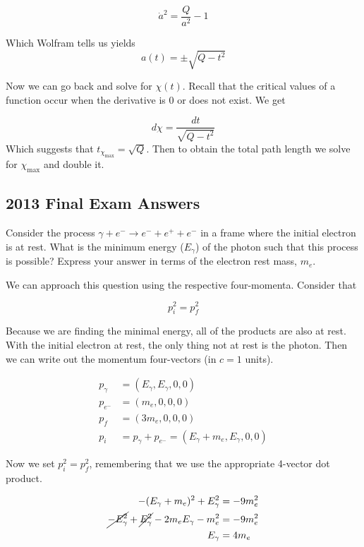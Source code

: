 \documentclass[11pt,largemargins]{homework}
\begin{document}
$$
\dot{a}^2 = \frac{Q}{a^2} - 1
$$

Which Wolfram tells us yields
$$
a(t) = \pm \sqrt{Q - t^2}
$$

Now we can go back and solve for $\chi(t)$.  Recall that the critical values of a function occur when the derivative is 0 or does not exist.  We get 

$$
d\chi = \frac{dt}{\sqrt{Q - t^2}}
$$
Which suggests that $t_{\chi_{\mathrm{max}}} = \sqrt{Q}$.  Then to obtain the total path length we solve for $\chi_{\mathrm{max}}$ and double it.

\setcounter{questionCounter}{0}

\subsection*{2013 Final Exam Answers}

\question
Consider the process $\gamma + e^- \to e^- + e^+ + e^-$ in a frame where the initial electron is at rest.  What is the minimum energy ($E_\gamma$) of the photon such that this process is possible?  Express your answer in terms of the electron rest mass, $m_e$.

We can approach this question using the respective four-momenta.  Consider that

$$p_{i}^2 = p_{f}^2 $$

Because we are finding the minimal energy, all of the products are also at rest.  With the initial electron at rest, the only thing not at rest is the photon.  Then we can write out the momentum four-vectors (in $c=1$ units).

\begin{subequations}
\begin{align*}
p_\gamma &= (E_\gamma, E_\gamma, 0, 0) \\
p_{e^-} &= (m_e, 0, 0, 0) \\
p_f &= (3m_e, 0, 0, 0) \\
p_i &= p_\gamma + p_{e^-} = (E_\gamma + m_e, E_\gamma, 0, 0)
\end{align*}
\end{subequations}

Now we set $p_{i}^2 = p_{f}^2$, remembering that we use the appropriate 4-vector dot product.

\begin{subequations}
\begin{align*}
-(E_\gamma + m_e)^2 + E_\gamma^2 &= -9m_e^2 \\
\cancel{-E_\gamma^2} + \cancel{E_\gamma^2} - 2m_e E_\gamma - m_e^2 &= -9m_e^2 \\
E_\gamma &= 4m_e
\end{align*}
\end{subequations}
\end{document}

